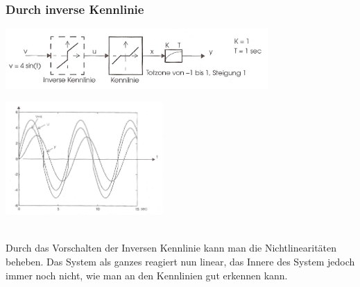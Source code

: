 		\subsubsection{Durch inverse Kennlinie }
		\begin{minipage}{11cm}
			\includegraphics[width=10cm]{./bilder/Kennlinienkompensation.jpg}
        \end{minipage}
		\begin{minipage}{6cm}
        	\includegraphics[width=6cm]{./bilder/Kennlinienkompensation_dia.jpg}
        \end{minipage}\\
			Durch das Vorschalten der Inversen Kennlinie kann man die Nichtlinearitäten
			beheben. Das System als ganzes reagiert nun linear, das Innere des System
			jedoch immer noch nicht, wie man an den Kennlinien gut erkennen kann.
			
